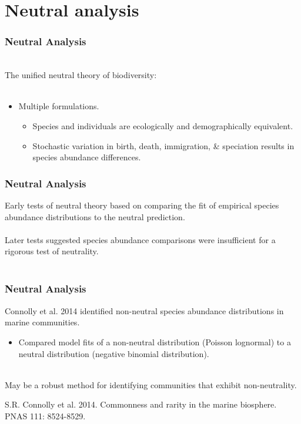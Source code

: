 \documentclass[14pt]{beamer}
\begin{document}
\section{Neutral analysis}
\begin{frame}[t]
\frametitle{Neutral Analysis}
~\\
The unified neutral theory of biodiversity:\\
~\\
\begin{itemize}
\item Multiple formulations.
\begin{itemize}
\item Species and individuals are ecologically and demographically equivalent.\\
\item Stochastic variation in birth, death, immigration, \& speciation results in species abundance differences.
\end{itemize}
\end{itemize}
\end{frame}

\begin{frame}
\frametitle{Neutral Analysis}
Early tests of neutral theory based on comparing the fit of empirical species abundance distributions to the neutral prediction.\\
~\\
Later tests suggested species abundance comparisons were insufficient for a rigorous test of neutrality.\\
~\\
\end{frame}

\begin{frame}
\frametitle{Neutral Analysis}
Connolly et al. 2014 identified non-neutral species abundance distributions in marine communities.\\
\begin{small}
\begin{itemize}
\item Compared model fits of a non-neutral distribution (Poisson lognormal) to a neutral distribution (negative binomial distribution).\\
\end{itemize}
\end{small}
~\\
May be a robust method for identifying communities that exhibit non-neutrality.\\
\begin{tiny}
S.R. Connolly et al. 2014. Commonness and rarity in the marine biosphere. PNAS 111: 8524-8529.
\end{tiny}
\end{frame}
\end{document}
